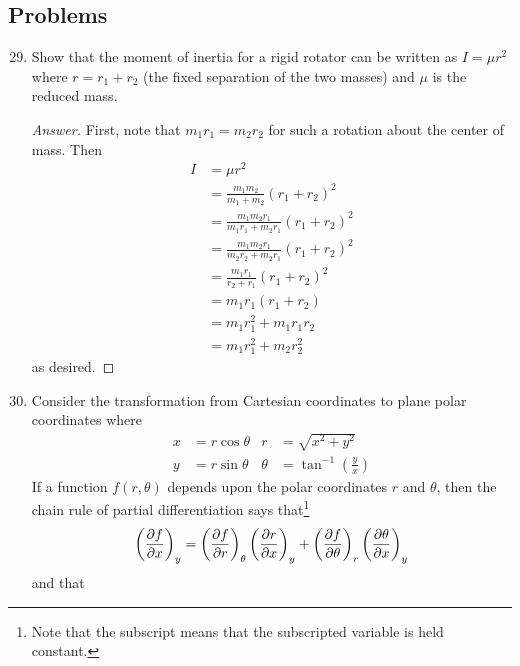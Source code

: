 \documentclass[../notes.tex]{subfiles}
\begin{document}
\subsection*{Problems}
\begin{enumerate}[label={\textbf{5-\arabic*.}},ref={5-\arabic*}]
    \setcounter{enumi}{28}
    \item \label{prb:5-29}Show that the moment of inertia for a rigid rotator can be written as $I=\mu r^2$ where $r=r_1+r_2$ (the fixed separation of the two masses) and $\mu$ is the reduced mass.
    \begin{proof}[Answer]
        First, note that $m_1r_1=m_2r_2$ for such a rotation about the center of mass. Then
        \begingroup
        \allowdisplaybreaks
        \begin{align*}
            I &= \mu r^2\\
            &= \frac{m_1m_2}{m_1+m_2}(r_1+r_2)^2\\
            &= \frac{m_1m_2r_1}{m_1r_1+m_2r_1}(r_1+r_2)^2\\
            &= \frac{m_1m_2r_1}{m_2r_2+m_2r_1}(r_1+r_2)^2\\
            &= \frac{m_1r_1}{r_2+r_1}(r_1+r_2)^2\\
            &= m_1r_1(r_1+r_2)\\
            &= m_1r_1^2+m_1r_1r_2\\
            &= m_1r_1^2+m_2r_2^2
        \end{align*}
        \endgroup
        as desired.
    \end{proof}
    \item \label{prb:5-30}Consider the transformation from Cartesian coordinates to plane polar coordinates where
    \begin{align*}
        x &= r\cos\theta&
            r &= \sqrt{x^2+y^2}\\
        y &= r\sin\theta&
            \theta &= \tan^{-1}\left( \frac{y}{x} \right)
    \end{align*}
    If a function $f(r,\theta)$ depends upon the polar coordinates $r$ and $\theta$, then the chain rule of partial differentiation says that\footnote{Note that the subscript means that the subscripted variable is held constant.}
    \begin{equation*}
        \left( \pdv{f}{x} \right)_y = \left( \pdv{f}{r} \right)_\theta\left( \pdv{r}{x} \right)_y+\left( \pdv{f}{\theta} \right)_r\left( \pdv{\theta}{x} \right)_y
    \end{equation*}
    and that
    \begin{equation*}

\end{equation*}
\end{enumerate}
\end{document}
